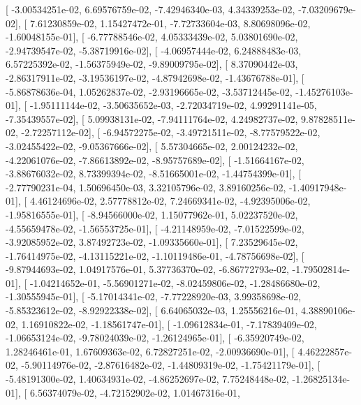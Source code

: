 \documentclass{article}
\begin{document}
       [ -3.00534251e-02,   6.69576759e-02,  -7.42946340e-03,
          4.34339253e-02,  -7.03209679e-02],
       [  7.61230859e-02,   1.15427472e-01,  -7.72733604e-03,
          8.80698096e-02,  -1.60048155e-01],
       [ -6.77788546e-02,   4.05333439e-02,   5.03801690e-02,
         -2.94739547e-02,  -5.38719916e-02],
       [ -4.06957444e-02,   6.24888483e-03,   6.57225392e-02,
         -1.56375949e-02,  -9.89009795e-02],
       [  8.37090442e-03,  -2.86317911e-02,  -3.19536197e-02,
         -4.87942698e-02,  -1.43676788e-01],
       [ -5.86878636e-04,   1.05262837e-02,  -2.93196665e-02,
         -3.53712445e-02,  -1.45276103e-01],
       [ -1.95111144e-02,  -3.50635652e-03,  -2.72034719e-02,
          4.99291141e-05,  -7.35439557e-02],
       [  5.09938131e-02,  -7.94111764e-02,   4.24982737e-02,
          9.87828511e-02,  -2.72257112e-02],
       [ -6.94572275e-02,  -3.49721511e-02,  -8.77579522e-02,
         -3.02455422e-02,  -9.05367666e-02],
       [  5.57304665e-02,   2.00124232e-02,  -4.22061076e-02,
         -7.86613892e-02,  -8.95757689e-02],
       [ -1.51664167e-02,  -3.88676032e-02,   8.73399394e-02,
         -8.51665001e-02,  -1.44754399e-01],
       [ -2.77790231e-04,   1.50696450e-03,   3.32105796e-02,
          3.89160256e-02,  -1.40917948e-01],
       [  4.46124696e-02,   2.57778812e-02,   7.24669341e-02,
         -4.92395006e-02,  -1.95816555e-01],
       [ -8.94566000e-02,   1.15077962e-01,   5.02237520e-02,
         -4.55659478e-02,  -1.56553725e-01],
       [ -4.21148959e-02,  -7.01522599e-02,  -3.92085952e-02,
          3.87492723e-02,  -1.09335660e-01],
       [  7.23529645e-02,  -1.76414975e-02,  -4.13115221e-02,
         -1.10119486e-01,  -4.78756698e-02],
       [ -9.87944693e-02,   1.04917576e-01,   5.37736370e-02,
         -6.86772793e-02,  -1.79502814e-01],
       [ -1.04214652e-01,  -5.56901271e-02,  -8.02459806e-02,
         -1.28486680e-02,  -1.30555945e-01],
       [ -5.17014341e-02,  -7.77228920e-03,   3.99358698e-02,
         -5.85323612e-02,  -8.92922338e-02],
       [  6.64065032e-03,   1.25556216e-01,   4.38890106e-02,
          1.16910822e-02,  -1.18561747e-01],
       [ -1.09612834e-01,  -7.17839409e-02,  -1.06653124e-02,
         -9.78024039e-02,  -1.26124965e-01],
       [ -6.35920749e-02,   1.28246461e-01,   1.67609363e-02,
          6.72827251e-02,  -2.00936690e-01],
       [  4.46222857e-02,  -5.90114976e-02,  -2.87616482e-02,
         -1.44809319e-02,  -1.75421179e-01],
       [ -5.48191300e-02,   1.40634931e-02,  -4.86252697e-02,
          7.75248448e-02,  -1.26825134e-01],
       [  6.56374079e-02,  -4.72152902e-02,   1.01467316e-01,
\end{document}
